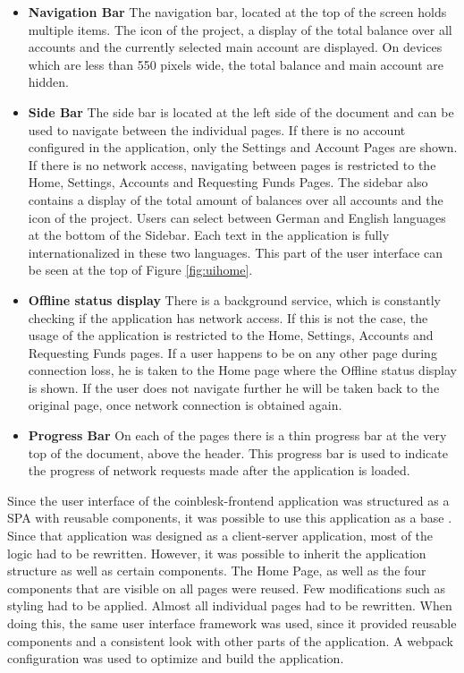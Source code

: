 \begin{itemize}
\item \textbf{Navigation Bar}
The navigation bar, located at the top of the screen holds multiple items. The icon of the project, a display of the total balance over all accounts and the currently selected main account are displayed.
On devices which are less than 550 pixels wide, the total balance and main account are hidden.
\item \textbf{Side Bar}
The side bar is located at the left side of the document and can be used to navigate between the individual pages. If there is no account configured in the application, only the Settings and Account Pages are shown. If there is no network access, navigating between pages is restricted to the Home, Settings, Accounts and Requesting Funds Pages.
The sidebar also contains a display of the total amount of balances over all accounts and the icon of the project. Users can select between German and English languages at the bottom of the Sidebar. Each text in the application is fully internationalized in these two languages. This part of the user interface can be seen at the top of Figure \ref{fig:uihome}.


\item \textbf{Offline status display}
There is a background service, which is constantly checking if the application has network access. If this is not the case, the usage of the application is restricted to the Home, Settings, Accounts and Requesting Funds pages. If a user happens to be on any other page during connection loss, he is taken to the Home page where the Offline status display is shown. If the user does not navigate further he will be taken back to the original page, once network connection is obtained again.
\item \textbf{Progress Bar}
On each of the pages there is a thin progress bar at the very top of the document, above the header. This progress bar is used to indicate the progress of network requests made after the application is loaded.

\end{itemize}

Since the user interface of the coinblesk-frontend application was structured as a SPA with reusable components, it was possible to use this application as a base \cite{coinbleskfrontend}. Since that application was designed as a client-server application, most of the logic had to be rewritten. However, it was possible to inherit the application structure as well as certain components. The Home Page, as well as the four components that are visible on all pages were reused. Few modifications such as styling had to be applied. Almost all individual pages had to be rewritten. When doing this, the same user interface framework was used, since it provided reusable components and a consistent look with other parts of the application. A webpack configuration was used to optimize and build the application.


